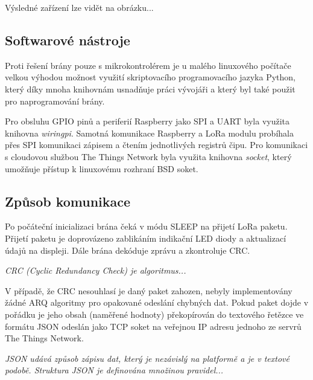         Výsledné zařízení lze vidět na obrázku...
    
        
\subsection{Softwarové nástroje}

    Proti řešení brány pouze s mikrokontrolérem je u malého linuxového počítače velkou výhodou možnost využití skriptovacího programovacího jazyka Python, který díky mnoha knihovnám usnadňuje práci vývojáři a který byl také použit pro naprogramování brány.

    Pro obsluhu GPIO pinů a periferií Raspberry jako SPI a UART byla využita knihovna \textit{wiringpi}. Samotná komunikace Raspberry a LoRa modulu probíhala přes SPI komunikaci zápisem a čtením jednotlivých registrů čipu. 
    Pro komunikaci s cloudovou službou The Things Network byla využita knihovna \textit{socket}, který umožňuje přístup k linuxovému rozhraní BSD soket.



\subsection{Způsob komunikace}
    Po počáteční inicializaci brána čeká v módu SLEEP na přijetí LoRa paketu. Přijetí paketu je doprovázeno zablikáním indikační LED diody a aktualizací údajů na displeji. Dále brána dekóduje zprávu a zkontroluje CRC. 
    
    
    \textit{CRC (Cyclic Redundancy Check) je algoritmus...}
    

    V případě, že CRC nesouhlasí je daný paket zahozen, nebyly implementovány žádné ARQ algoritmy pro  opakované odeslání chybných dat. Pokud paket dojde v pořádku je jeho obsah (naměřené hodnoty) překopírován do textového řetězce ve formátu JSON  odeslán jako TCP soket na veřejnou IP adresu jednoho ze servrů The Things Network.
    
     

    \textit{JSON udává způsob zápisu dat, který je nezávislý na platformě a je v textové podobě. Struktura JSON je definována  množinou pravidel...}
    



  
